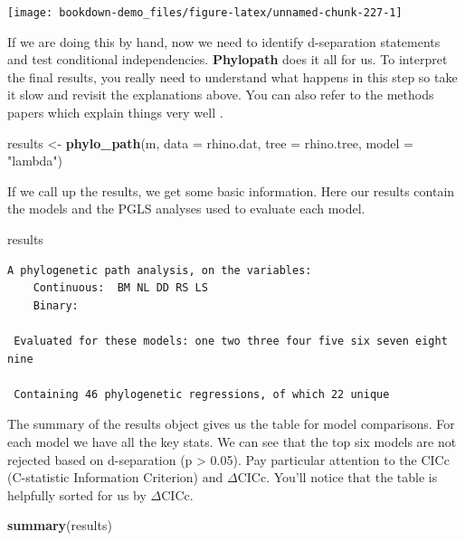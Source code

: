 \documentclass[
]{book}
\newenvironment{Shaded}{\begin{snugshade}}{\end{snugshade}}
\newcommand{\DataTypeTok}[1]{\textcolor[rgb]{0.13,0.29,0.53}{#1}}
\newcommand{\KeywordTok}[1]{\textcolor[rgb]{0.13,0.29,0.53}{\textbf{#1}}}
\newcommand{\NormalTok}[1]{#1}
\newcommand{\StringTok}[1]{\textcolor[rgb]{0.31,0.60,0.02}{#1}}
\begin{document}
\begin{center}\texttt{[image: bookdown-demo\_files/figure-latex/unnamed-chunk-227-1]} \end{center}

If we are doing this by hand, now we need to identify d-separation statements and test conditional independencies. \textbf{Phylopath} does it all for us. To interpret the final results, you really need to understand what happens in this step so take it slow and revisit the explanations above. You can also refer to the methods papers which explain things very well \citep{Hardenberg13, Gonzalez14}.

\begin{Shaded}
\begin{Highlighting}[]
\NormalTok{results \textless{}{-}}\StringTok{ }\KeywordTok{phylo\_path}\NormalTok{(m, }\DataTypeTok{data =}\NormalTok{ rhino.dat, }\DataTypeTok{tree =}\NormalTok{ rhino.tree, }\DataTypeTok{model =} \StringTok{"lambda"}\NormalTok{)}
\end{Highlighting}
\end{Shaded}

If we call up the results, we get some basic information. Here our results contain the models and the PGLS analyses used to evaluate each model.

\begin{Shaded}
\begin{Highlighting}[]
\NormalTok{results}
\end{Highlighting}
\end{Shaded}

\begin{verbatim}
A phylogenetic path analysis, on the variables:
    Continuous:  BM NL DD RS LS 
    Binary:       

 Evaluated for these models: one two three four five six seven eight nine 

 Containing 46 phylogenetic regressions, of which 22 unique
\end{verbatim}

The summary of the results object gives us the table for model comparisons. For each model we have all the key stats. We can see that the top six models are not rejected based on d-separation (p \textgreater{} 0.05). Pay particular attention to the CICc (C-statistic Information Criterion) and \(\Delta\)CICc. You'll notice that the table is helpfully sorted for us by \(\Delta\)CICc.

\begin{Shaded}
\begin{Highlighting}[]
\KeywordTok{summary}\NormalTok{(results)}
\end{Highlighting}
\end{Shaded}
\end{document}
